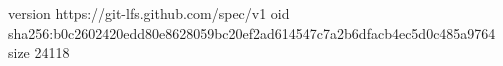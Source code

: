 version https://git-lfs.github.com/spec/v1
oid sha256:b0c2602420edd80e8628059bc20ef2ad614547c7a2b6dfacb4ec5d0c485a9764
size 24118
